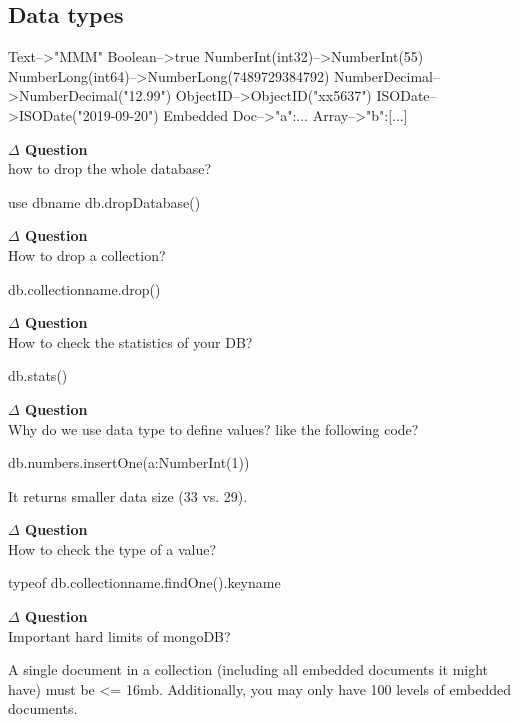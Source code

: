 \documentclass[12pt]{article}
\newenvironment{que}
    { \begin{mdframed}[backgroundcolor=green!20] \textbf{$\Delta$ Question} \\}
    {  \end{mdframed}}
\begin{document}
\subsection{Data types}
\begin{code}
Text-->"MMM"
Boolean-->true
NumberInt(int32)-->NumberInt(55) 
NumberLong(int64)-->NumberLong(7489729384792)
NumberDecimal-->NumberDecimal("12.99")
ObjectID-->ObjectID("xx5637")
ISODate-->ISODate("2019-09-20")
Embedded Doc-->{"a":{...}}
Array-->{"b":[...]}
\end{code}
\begin{que}
how to drop the whole database?
\end{que}
\begin{code}
use dbname
db.dropDatabase()
\end{code}
\begin{que}
How to drop a collection?
\end{que}
\begin{code}
db.collectionname.drop()
\end{code}
\begin{que}
How to check the statistics of your DB?
\end{que}
\begin{code}
db.stats()
\end{code}
\begin{que}
Why do we use data type to define values? like the following code?
\end{que}
\begin{code}
db.numbers.insertOne({a:NumberInt(1)})
\end{code}
It returns smaller data size (33 vs. 29).
\begin{que}
How to check the type of a value?
\end{que}
\begin{code}
typeof db.collectionname.findOne().keyname
\end{code}
\begin{que}
Important hard limits of mongoDB?
\end{que}
A single document in a collection (including all embedded documents it might have) must be <= 16mb. Additionally, you may only have 100 levels of embedded documents.
\end{document}

